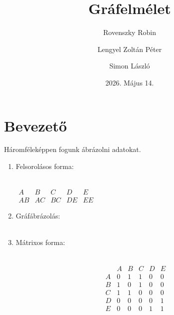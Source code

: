 \documentclass{article}
\title{Gráfelmélet}
\author{Rovenszky Robin \and Lengyel Zoltán Péter \and Simon László}
\date{2026. Május 14.}
\begin{document}

\maketitle
\tableofcontents
\newpage

\section{Bevezető}

Háromféleképpen fogunk ábrázolni adatokat.

\begin{enumerate}
\item Felsorolásos forma: \\ \\
\begin{center}
    $\begin{matrix}
    A & B & C & D & E\\
    AB & AC & BC & DE & EE
    \end{matrix}$
\end{center}

\item Gráfábrázolás: \\ \\
\begin{center}
\end{center}

\item Mátrixos forma: \\ \\
\begin{center}
    \[
        \begin{matrix}
         & A & B & C & D & E \\
         A & 0 & 1 & 1 & 0 & 0\\
         B & 1 & 0 & 1 & 0 & 0\\
         C & 1 & 1 & 0 & 0 & 0\\
         D & 0 & 0 & 0 & 0 & 1\\
         E & 0 & 0 & 0 & 1 & 1
        \end{matrix}
    \]
\end{center}
\end{enumerate}
\end{document}
